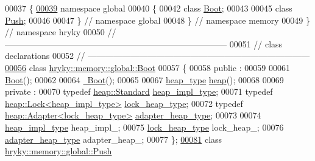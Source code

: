 \begin{DoxyCode}
00037 \{
\hypertarget{memory__global__common_8h_source_l00039}{}\hyperlink{namespacehryky_1_1memory_1_1global}{00039} \textcolor{keyword}{namespace }global
00040 \{
00042     \textcolor{keyword}{class }\hyperlink{classhryky_1_1memory_1_1global_1_1_boot}{Boot};
00043     
00045     \textcolor{keyword}{class }\hyperlink{classhryky_1_1memory_1_1global_1_1_push}{Push};
00046 
00047 \} \textcolor{comment}{// namespace global}
00048 \} \textcolor{comment}{// namespace memory}
00049 \} \textcolor{comment}{// namespace hryky}
00050 \textcolor{comment}{//
      ------------------------------------------------------------------------------}
00051 \textcolor{comment}{// class declarations}
00052 \textcolor{comment}{//
      ------------------------------------------------------------------------------}
\hypertarget{memory__global__common_8h_source_l00056}{}\hyperlink{classhryky_1_1memory_1_1global_1_1_boot}{00056} \textcolor{comment}{}\textcolor{keyword}{class }\hyperlink{classhryky_1_1memory_1_1global_1_1_boot}{hryky::memory::global::Boot}
00057 \{
00058 \textcolor{keyword}{public} :
00059 
00061     \hyperlink{classhryky_1_1memory_1_1global_1_1_boot_af8a73189ccbab7dd2e5b14517efa4a68}{Boot}();
00062 
00064     \hyperlink{classhryky_1_1memory_1_1global_1_1_boot_ab8f241478f7c2446ce01267202774b3b}{~Boot}();
00065 
00067     \hyperlink{classhryky_1_1memory_1_1heap_1_1_base}{heap_type} \hyperlink{classhryky_1_1memory_1_1global_1_1_boot_a9e38ca182b6e93d9dc118386c91edfc3}{heap}();
00068 
00069 \textcolor{keyword}{private} :
00070     \textcolor{keyword}{typedef} \hyperlink{classhryky_1_1memory_1_1heap_1_1_standard}{heap::Standard}                  \hyperlink{classhryky_1_1memory_1_1heap_1_1_standard}{heap_impl_type};
00071     \textcolor{keyword}{typedef} \hyperlink{classhryky_1_1memory_1_1heap_1_1_lock}{heap::Lock<heap_impl_type>}      \hyperlink{classhryky_1_1memory_1_1heap_1_1_lock}{lock_heap_type};
00072     \textcolor{keyword}{typedef} \hyperlink{classhryky_1_1memory_1_1heap_1_1_adapter}{heap::Adapter<lock_heap_type>}   \hyperlink{classhryky_1_1memory_1_1heap_1_1_adapter}{adapter_heap_type};
00073 
00074     \hyperlink{classhryky_1_1memory_1_1heap_1_1_standard}{heap_impl_type}          heap\_impl\_;
00075     \hyperlink{classhryky_1_1memory_1_1heap_1_1_lock}{lock_heap_type}          lock\_heap\_;
00076     \hyperlink{classhryky_1_1memory_1_1heap_1_1_adapter}{adapter_heap_type}       adapter\_heap\_;
00077 \};
\hypertarget{memory__global__common_8h_source_l00081}{}\hyperlink{classhryky_1_1memory_1_1global_1_1_push}{00081} \textcolor{keyword}{class }\hyperlink{classhryky_1_1memory_1_1global_1_1_push}{hryky::memory::global::Push}

\end{DoxyCode}
